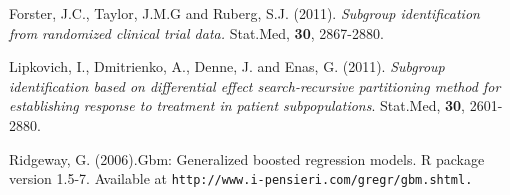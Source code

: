\documentclass[12pt]{article}
\begin{document}
\baselineskip 5mm
\begin{description}
\begin{small}
\item
Forster, J.C., Taylor, J.M.G and Ruberg, S.J. (2011).
\textit{Subgroup identification from randomized clinical trial data.}
Stat.Med, {\bf 30}, 2867-2880.

\item
Lipkovich, I., Dmitrienko, A., Denne, J. and Enas, G. (2011). 
\textit{Subgroup identification based on
differential effect search-recursive partitioning method for establishing response to treatment in
patient subpopulations}. Stat.Med, {\bf 30}, 2601-2880.

\item
Ridgeway, G. (2006).Gbm: Generalized boosted regression models. R package version 1.5-7. Available at
\verb|http://www.i-pensieri.com/gregr/gbm.shtml.|



\end{small}
\end{description}
\end{document}
